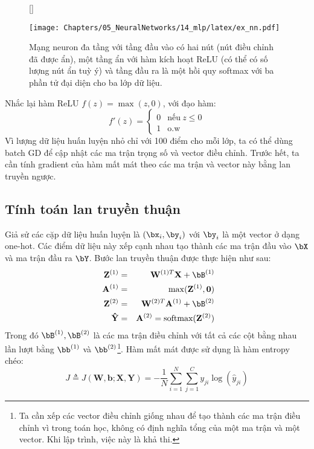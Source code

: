 \begin{figure}[t]
    [\FBwidth]
    {\caption{ 
    Mạng neuron đa tầng với tầng đầu vào có hai nút (nút điều chỉnh đã được ẩn),
    một tầng ẩn với hàm kích hoạt ReLU (có thể có số lượng nút ẩn
    tuỳ ý) và tầng đầu ra là một hồi quy softmax với ba phần tử đại diện
    cho ba lớp dữ liệu. 
    }
    \label{fig:14_8}}
    { %
    \texttt{[image: Chapters/05\_NeuralNetworks/14\_mlp/latex/ex\_nn.pdf]}
    }
\end{figure}
Nhắc lại hàm ReLU $f(z) = \max(z, 0)$, với đạo hàm:
\begin{equation}
    f'(z) = \left\{ 
    \begin{matrix}
        0 & \text{nếu}~ z \leq 0 \\ 
        1 & \text{o.w}
    \end{matrix}
    \right. 
\end{equation}
Vì lượng dữ liệu huấn luyện nhỏ chỉ với 100 điểm cho mỗi lớp, ta có thể dùng
batch GD để cập nhật các ma trận trọng số và vector điều chỉnh. Trước hết, ta cần tính
gradient của hàm mất mát theo các ma trận và vector này bằng lan truyền ngược.

 
\subsection{Tính toán lan truyền thuận}
Giả sử các cặp dữ liệu huấn luyện là $(\bx_i, \by_i)$ với $\by_i$ là một vector
ở dạng one-hot. Các điểm dữ liệu này xếp cạnh nhau tạo thành các ma trận đầu
vào $\bX$ và ma trận đầu ra $\bY$. Bước lan truyền thuận được
thực hiện như sau:
\begin{eqnarray} 
\mathbf{Z}^{(1)} &=& \mathbf{W}^{(1)T}\mathbf{X} + \bB^{(1)}\\\ 
\mathbf{A}^{(1)} &=& \max(\mathbf{Z}^{(1)}, \mathbf{0}) \\\ 
\mathbf{Z}^{(2)} &=& \mathbf{W}^{(2)T}\mathbf{A}^{(1)} + \bB^{(2)}\\\ 
\mathbf{\hat{Y}} &=& \mathbf{A}^{(2)} = \text{softmax}(\mathbf{Z}^{(2)}) 
\end{eqnarray} 
Trong đó $\bB^{(1)}, \bB^{(2)}$ là các ma trận điều chỉnh với tất cả các cột bằng nhau
lần lượt bằng $\bb^{(1)}$ và $\bb^{(2)}$\footnote{Ta cần xếp các vector điều chỉnh
giống nhau để tạo thành các ma trận điều chỉnh vì trong toán học, không có định nghĩa
tổng của một ma trận và một vector. Khi lập trình, việc này là khả thi.}.
Hàm mất mát được sử dụng là hàm entropy chéo:
\begin{equation} 
J \triangleq J(\mathbf{W, b}; \mathbf{X, Y}) = -\frac{1}{N}\sum_{i = 1}^N \sum_{j = 1}^C y_{ji}\log(\hat{y}_{ji}) 
\end{equation} 
 
